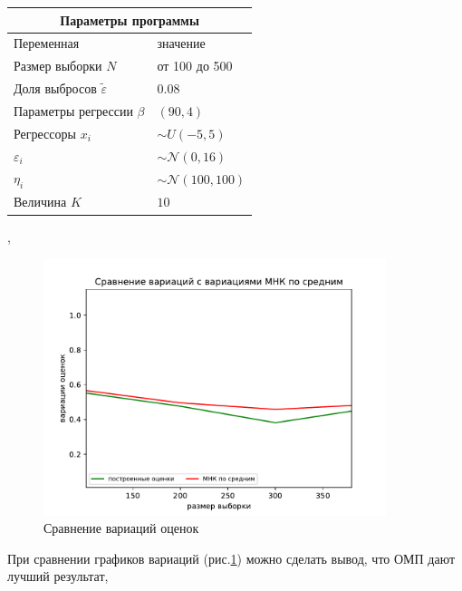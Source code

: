 \begin{center}
    \label{tab1}
    \begin{tabular}{|p{5cm}|p{5cm}|}
        \hline
        \multicolumn{2}{|c|}{Параметры программы} \\
        \hline
        Переменная&значение\\
        \hline
        Размер выборки $N$& от 100 до 500\\
        \hline
        Доля выбросов $\widetilde{\varepsilon}$& 0.08\\
        \hline
        Параметры регрессии $\beta$& $(90,4)$\\
        \hline
        Регрессоры $x_i$ & $\sim U(-5,5)$\\
        \hline
        $\varepsilon_i$&$\sim \mathcal{N}(0,16)$\\
        \hline
        $\eta_i$&$\sim \mathcal{N}(100,100)$\\
        \hline
        Величина $K$  &$10$\\
        \hline
    \end{tabular},
\end{center}
\begin{figure}[h!]
    \centering
    \includegraphics[width=100mm]{../images/OLS_GEM.pdf}
    \caption{Сравнение вариаций оценок\label{overflow}}
    \label{pic0}
\end{figure}
При сравнении графиков вариаций (рис.\ref{pic0}) можно сделать вывод, что ОМП дают лучший результат, 

